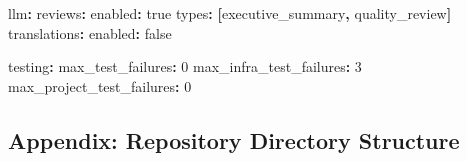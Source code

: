 \documentclass[
]{article}
\newenvironment{Shaded}{}{}
\newcommand{\AttributeTok}[1]{\textcolor[rgb]{0.49,0.56,0.16}{#1}}
\newcommand{\CharTok}[1]{\textcolor[rgb]{0.25,0.44,0.63}{#1}}
\newcommand{\DecValTok}[1]{\textcolor[rgb]{0.25,0.63,0.44}{#1}}
\newcommand{\FunctionTok}[1]{\textcolor[rgb]{0.02,0.16,0.49}{#1}}
\newcommand{\KeywordTok}[1]{\textcolor[rgb]{0.00,0.44,0.13}{\textbf{#1}}}
\begin{document}
\begin{Shaded}
\begin{Highlighting}[]
\FunctionTok{llm}\KeywordTok{:}
\AttributeTok{  }\FunctionTok{reviews}\KeywordTok{:}
\AttributeTok{    }\FunctionTok{enabled}\KeywordTok{:}\AttributeTok{ }\CharTok{true}
\AttributeTok{    }\FunctionTok{types}\KeywordTok{:}\AttributeTok{ }\KeywordTok{[}\AttributeTok{executive\_summary}\KeywordTok{,}\AttributeTok{ quality\_review}\KeywordTok{]}
\AttributeTok{  }\FunctionTok{translations}\KeywordTok{:}
\AttributeTok{    }\FunctionTok{enabled}\KeywordTok{:}\AttributeTok{ }\CharTok{false}

\FunctionTok{testing}\KeywordTok{:}
\AttributeTok{  }\FunctionTok{max\_test\_failures}\KeywordTok{:}\AttributeTok{ }\DecValTok{0}
\AttributeTok{  }\FunctionTok{max\_infra\_test\_failures}\KeywordTok{:}\AttributeTok{ }\DecValTok{3}
\AttributeTok{  }\FunctionTok{max\_project\_test\_failures}\KeywordTok{:}\AttributeTok{ }\DecValTok{0}
\end{Highlighting}
\end{Shaded}

\newpage

\newpage

\subsection{Appendix: Repository Directory
Structure}\label{appendix-directory}
\end{document}
